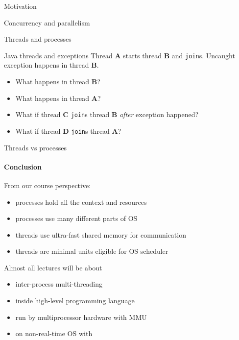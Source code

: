 \begin{section}{Motivation}
\begin{section}{Concurrency and parallelism}
\begin{section}{Threads and processes}
\begin{frame}[fragile]{Java threads and exceptions}
Thread \textbf{A} starts thread \textbf{B} and \texttt{join}s. Uncaught exception happens in thread \textbf{B}. 

\begin{itemize}
    \item What happens in thread \textbf{B}?
    \item What happens in thread \textbf{A}?
    \item What if thread \textbf{C} \texttt{join}s thread \textbf{B} \textit{after} exception happened?
    \item What if thread \textbf{D} \texttt{join}s thread \textbf{A}?
\end{itemize}

\pause

\begin{homeworkmail}{Task \taskExceptions}
    Create 3 Java programs for these cases, explain results in several sentences.
}
\end{homeworkmail}

\end{frame}




\begin{frame}{Threads vs processes}
\framesubtitle{Conclusion}

From our course perspective:
\begin{itemize}
    \item processes hold all the context and resources
    \item processes use many different parts of OS
    \item threads use ultra-fast shared memory for communication 
    \item threads are minimal units eligible for OS scheduler
\end{itemize}

Almost all lectures will be about
\begin{itemize}
    \item inter-process multi-threading 
    \item inside high-level programming language
    \item run by multiprocessor hardware with MMU
    \item on non-real-time OS with     
\end{itemize}
\end{frame}


\end{section}
\end{section}
\end{section}
